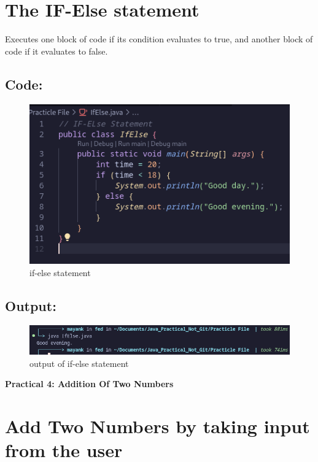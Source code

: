 \documentclass[a4paper,12pt]{article}
\newcommand{\practicaltitle}[1]{
    \newpage
    \begin{center}
        \Large\textbf{#1} \\
        \normalsize\vspace{0.5cm}
    \end{center}
}
\begin{document}
\section{The IF-Else statement}
Executes one block of code if its condition evaluates to true, and another block of code if it evaluates to false.
\subsection{Code: }
\begin{figure}[H]
    \centering
    \includegraphics[width=0.9\linewidth]{images/if_else.png}
    \caption{if-else statement}
    \label{fig:sample_image}
\end{figure}
\subsection{Output: }
\begin{figure}[H]
    \centering
    \includegraphics[width=0.9\linewidth]{images/output5.png}
    \caption{output of if-else statement}
    \label{fig:sample_image}
\end{figure}


\setcounter{section}{0}

\practicaltitle{Practical 4: Addition Of Two Numbers}
\section{Add Two Numbers by taking input from the user}
\end{document}
